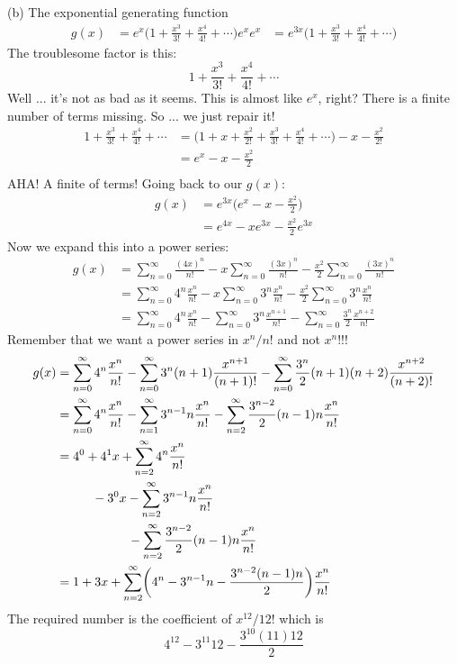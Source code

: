 (b) The exponential generating function
\begin{align*}
g(x)
&= e^x \biggl( 1 + \frac{x^3}{3!} + \frac{x^4}{4!} + \cdots \biggr)
   e^x e^x
&= e^{3x} \biggl( 1 + \frac{x^3}{3!} + \frac{x^4}{4!} + \cdots \biggr)
\end{align*}
The troublesome factor is this:
\[
1 + \frac{x^3}{3!} + \frac{x^4}{4!} + \cdots
\]
Well ... it's not as bad as it seems.
This is almost like $e^x$, right?
There is a finite number of terms missing.
So ... we just repair it!
\begin{align*}
1 + \frac{x^3}{3!} + \frac{x^4}{4!} + \cdots
&= \biggl( 1 +
   x + 
   \frac{x^2}{2!} + 
   \frac{x^3}{3!} + 
   \frac{x^4}{4!} + \cdots \biggr)
   - x - \frac{x^2}{2!} \\
&= e^x - x - \frac{x^2}{2} \\
\end{align*}
AHA! A finite of terms!
Going back to our $g(x)$:
\begin{align*}
g(x)
&= e^{3x} \biggl( e^x - x - \frac{x^2}{2} \biggr) \\
&= e^{4x} - xe^{3x} - \frac{x^2}{2} e^{3x}
\end{align*}
Now we expand this into a power series:
\begin{align*}
g(x)
&= \sum_{n=0}^\infty \frac{(4x)^n}{n!} 
   - x \sum_{n=0}^\infty \frac{(3x)^n}{n!} 
   - \frac{x^2}{2} \sum_{n=0}^\infty \frac{(3x)^n}{n!} \\
&= \sum_{n=0}^\infty 4^n \frac{x^n}{n!} 
   - x \sum_{n=0}^\infty 3^n \frac{x^n}{n!} 
   - \frac{x^2}{2} \sum_{n=0}^\infty 3^n \frac{x^n}{n!} \\
&= \sum_{n=0}^\infty 4^n \frac{x^n}{n!} 
   - \sum_{n=0}^\infty 3^n \frac{x^{n+1}}{n!} 
   - \sum_{n=0}^\infty \frac{3^n}{2} \frac{x^{n+2}}{n!}
\end{align*}
Remember that we want a power series in $x^n/n!$ and not $x^n$!!!
\begin{align*}
g(x)
&= \sum_{n=0}^\infty 4^n \frac{x^n}{n!} 
   - \sum_{n=0}^\infty 3^n (n+1)\frac{x^{n+1}}{(n+1)!} 
   - \sum_{n=0}^\infty \frac{3^n}{2} (n+1)(n+2)\frac{x^{n+2}}{(n+2)!} \\
&= \sum_{n=0}^\infty 4^n \frac{x^n}{n!} 
   - \sum_{n=1}^\infty 3^{n-1} n \frac{x^n}{n!} 
   - \sum_{n=2}^\infty 
     \frac{3^{n-2}}{2}  
     (n - 1) 
     n 
     \frac{x^n}{n!} \\
&= 4^0 + 4^1 x + \sum_{n=2}^\infty 4^n \frac{x^n}{n!} \\
&\hskip 1cm  - 3^0 x - \sum_{n=2}^\infty 3^{n-1} n \frac{x^n}{n!} \\ 
&\hskip 2cm  - \sum_{n=2}^\infty \frac{3^{n-2}}{2} (n - 1) n \frac{x^n}{n!} \\
&= 1 + 3x + 
   \sum_{n=2}^\infty 
   \biggl(
   4^n - 3^{n-1}n - \frac{3^{n-2}(n-1)n}{2}
   \biggr) \frac{x^n}{n!}
\end{align*}
The required number is the coefficient of $x^{12}/12!$ which is
\[
   4^{12} - 3^{11}12 - \frac{3^{10}(11)12}{2}
\]




